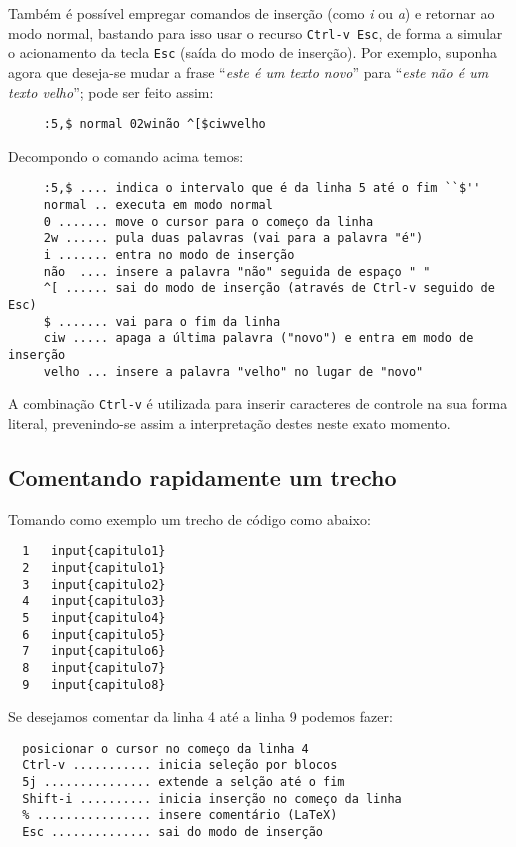 Também é possível empregar comandos de inserção (como {\em i} ou {\em a}) e
retornar ao modo normal, bastando para isso usar o recurso \verb|Ctrl-v Esc|,
de forma a simular o acionamento da tecla \verb|Esc| (saída do modo de
inserção). Por exemplo, suponha agora que deseja-se mudar a frase ``{\em este
é um texto novo}'' para ``{\em este não é um texto velho}''; pode ser feito
assim:

\begin{verbatim}
     :5,$ normal 02winão ^[$ciwvelho
\end{verbatim}

Decompondo o comando acima temos:

\begin{verbatim}
     :5,$ .... indica o intervalo que é da linha 5 até o fim ``$''
     normal .. executa em modo normal
     0 ....... move o cursor para o começo da linha
     2w ...... pula duas palavras (vai para a palavra "é")
     i ....... entra no modo de inserção
     não  .... insere a palavra "não" seguida de espaço " "
     ^[ ...... sai do modo de inserção (através de Ctrl-v seguido de Esc)
     $ ....... vai para o fim da linha
     ciw ..... apaga a última palavra ("novo") e entra em modo de inserção
     velho ... insere a palavra "velho" no lugar de "novo"
\end{verbatim}

A combinação \verb|Ctrl-v| é utilizada para inserir caracteres de controle na
sua forma literal, prevenindo-se assim a interpretação destes neste exato
momento.

\subsection{Comentando rapidamente um trecho}

Tomando como exemplo um trecho de código como abaixo:

\begin{verbatim}
  1   input{capitulo1}
  2   input{capitulo1}
  3   input{capitulo2}
  4   input{capitulo3}
  5   input{capitulo4}
  6   input{capitulo5}
  7   input{capitulo6}
  8   input{capitulo7}
  9   input{capitulo8}
\end{verbatim}

Se desejamos comentar da linha 4 até a linha 9 podemos fazer:

\begin{verbatim}
  posicionar o cursor no começo da linha 4
  Ctrl-v ........... inicia seleção por blocos
  5j ............... extende a selção até o fim
  Shift-i .......... inicia inserção no começo da linha
  % ................ insere comentário (LaTeX)
  Esc .............. sai do modo de inserção
\end{verbatim}


